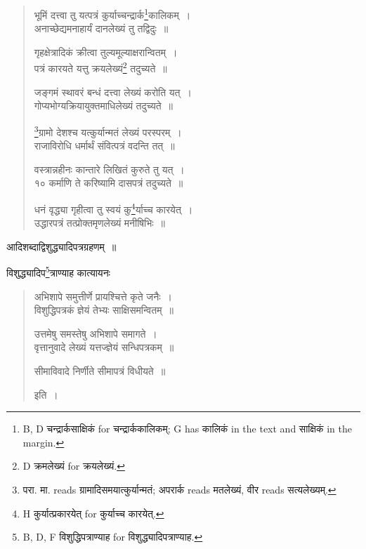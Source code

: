 \documentclass[11pt, openany]{book}
\begin{document}
\newpage
{}

\begin{quote}
{\vy भूमिं दत्त्वा तु यत्पत्रं कुर्याच्चन्द्रार्क\renewcommand{\thefootnote}{1}\footnote{B, D चन्द्रार्कसाक्षिकं for चन्द्रार्ककालिकम्; G has कालिकं in the text and साक्षिकं in the margin.}कालिकम्~।\\
अनाच्छेद्यमनाहार्यं दानलेख्यं तु तद्विदुः~॥

गृहक्षेत्रादिकं क्रीत्वा तुल्यमूल्याक्षरान्वितम्~।\\
पत्रं कारयते यत्तु क्रयलेख्यं\renewcommand{\thefootnote}{2}\footnote{D क्रमलेख्यं for क्रयलेख्यं.} तदुच्यते~॥

जङ्गमं स्थावरं बन्धं दत्त्वा लेख्यं करोति यत्~।\\
गोप्यभोग्यक्रियायुक्तमाधिलेख्यं तदुच्यते~॥

\renewcommand{\thefootnote}{3}\footnote{परा. मा. reads ग्रामादिसमयात्कुर्यान्मतं; अपरार्क reads मतलेख्यं, वीर reads सत्यलेख्यम्.}ग्रामो देशश्च यत्कुर्यान्मतं लेख्यं परस्परम्~।\\
राजाविरोधि धर्मार्थं संवित्पत्रं वदन्ति तत्~॥

वस्त्रान्नहीनः कान्तारे लिखितं कुरुते तु यत्~।\\
१० कर्माणि ते करिष्यामि दासपत्रं तदुच्यते~॥

धनं वृद्ध्या गृहीत्वा तु स्वयं कु\renewcommand{\thefootnote}{4}\footnote{H कुर्यात्प्रकारयेत् for कुर्याच्च कारयेत्.}र्याच्च कारयेत्~।\\
उद्धारपत्रं तत्प्रोक्तमृणलेख्यं मनीषिभिः~॥}
\end{quote}

\noindent
आदिशब्दाद्विशुद्ध्यादिपत्रग्रहणम्~॥ 

विशुद्ध्यादिप\renewcommand{\thefootnote}{5}\footnote{B, D, F विशुद्धिपत्राण्याह for विशुद्ध्यादिपत्राण्याह.}त्राण्याह कात्यायनः 

\begin{quote}
{\vy अभिशापे समुत्तीर्णे प्रायश्चित्ते कृते जनैः~।\\
विशुद्धिपत्रकं ज्ञेयं तेभ्यः साक्षिसमन्वितम्~॥

उत्तमेषु समस्तेषु अभिशापे समागते~।\\
वृत्तानुवादे लेख्यं यत्तज्ज्ञेयं सन्धिपत्रकम्~॥

सीमाविवादे निर्णीते सीमापत्रं विधीयते~॥} इति~।
\end{quote}

\newpage
{}
\fancyhead[RO]{[ $\S$ ४}
\fancyhead[LE]{$\S$ ४ ]}
\end{document}
